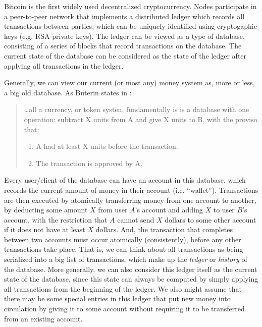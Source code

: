 \documentclass[10pt,a4paper]{article}
\begin{document}
Bitcoin \cite{nakamoto2009bitcoin} is the first widely used decentralized cryptocurrency. Nodes participate in a peer-to-peer network that implements a distributed ledger which records all transactions between parties, which can be uniquely identified using cryptogaphic keys (e.g. RSA private keys). The ledger can be viewed as a type of database, consisting of a series of blocks that record transactions on the database. The current state of the database can be considered as the state of the ledger after applying all transactions in the ledger.

Generally, we can view our current (or most any) money system as, more or less, a big old database. As Buterin states in \cite{Buterin2013}:

\begin{quote}
    \dots all a currency, or token systen, fundamentally is is a database with one operation: subtract X units from A and give X units to B, with the proviso that: 
    \begin{enumerate}[(1)]
        \item A had at least X units before the transaction.
        \item The transaction is approved by A. 
    \end{enumerate}
\end{quote}

Every user/client of the database can have an account in this database, which records the current amount of money in their account (i.e. ``wallet''). Transactions are then executed by atomically transferring money from one account to another, by deducting some amount $X$ from user $A$'s account and adding $X$ to user $B$'s account, with the restriction that $A$ cannot send $X$ dollars to some other account if it does not have at least $X$ dollars. And, the transaction that completes between two accounts must occur atomically (consistently), before any other transactions take place. That is, we can think about all transactions as being serialized into a big list of transactions, which make up the \textit{ledger} or \textit{history} of the database. More generally, we can also consider this ledger itself as the current state of the database, since this state can always be computed by simply applying all transactions from the beginning of the ledger. We also might assume that there may be some special entries in this ledger that put new money into circulation by giving it to some account without requiring it to be transferred from an existing account.
\end{document}
